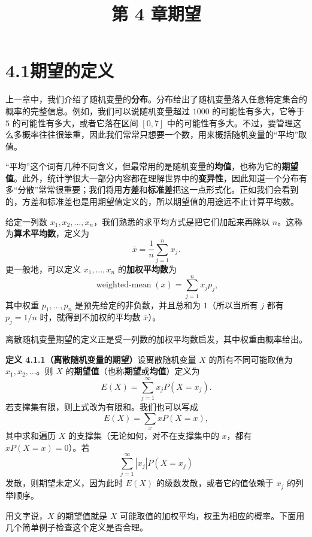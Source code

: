 \documentclass[UTF8,12pt,a4paper,fontset=fandol]{ctexart}
\title{第 4 章\quad 期望}
\author{}
\date{}
\begin{document}
\maketitle

\section*{4.1\quad 期望的定义}

上一章中，我们介绍了随机变量的\textbf{分布}。分布给出了随机变量落入任意特定集合的概率的完整信息。例如，我们可以说随机变量超过 $1000$ 的可能性有多大，它等于 $5$ 的可能性有多大，或者它落在区间 $[0,7]$ 中的可能性有多大。不过，要管理这么多概率往往很笨重，因此我们常常只想要一个数，用来概括随机变量的“平均”取值。

“平均”这个词有几种不同含义，但最常用的是随机变量的\textbf{均值}，也称为它的\textbf{期望值}。此外，统计学很大一部分内容都在理解世界中的\textbf{变异性}，因此知道一个分布有多“分散”常常很重要；我们将用\textbf{方差}和\textbf{标准差}把这一点形式化。正如我们会看到的，方差和标准差也是用期望值定义的，所以期望值的用途远不止计算平均数。

给定一列数 $x_1,x_2,\ldots,x_n$，我们熟悉的求平均方式是把它们加起来再除以 $n$。这称为\textbf{算术平均数}，定义为
\[
  \bar{x}=\frac{1}{n}\sum_{j=1}^n x_j.
\]
更一般地，可以定义 $x_1,\ldots,x_n$ 的\textbf{加权平均数}为
\[
  \operatorname{weighted\mbox{-}mean}(x)=\sum_{j=1}^n x_jp_j,
\]
其中权重 $p_1,\ldots,p_n$ 是预先给定的非负数，并且总和为 $1$（所以当所有 $j$ 都有 $p_j=1/n$ 时，就得到不加权的平均数 $\bar{x}$）。

离散随机变量期望的定义正是受一列数的加权平均数启发，其中权重由概率给出。

\noindent\textbf{定义 4.1.1（离散随机变量的期望）}\quad 设离散随机变量 $X$ 的所有不同可能取值为 $x_1,x_2,\ldots$。则 $X$ 的\textbf{期望值}（也称\textbf{期望}或\textbf{均值}）定义为
\[
  E(X)=\sum_{j=1}^{\infty}x_jP(X=x_j).
\]
若支撑集有限，则上式改为有限和。我们也可以写成
\[
  E(X)=\sum_x xP(X=x),
\]
其中求和遍历 $X$ 的支撑集（无论如何，对不在支撑集中的 $x$，都有 $xP(X=x)=0$）。若
\[
  \sum_{j=1}^{\infty}|x_j|P(X=x_j)
\]
发散，则期望未定义，因为此时 $E(X)$ 的级数发散，或者它的值依赖于 $x_j$ 的列举顺序。

用文字说，$X$ 的期望值就是 $X$ 可能取值的加权平均，权重为相应的概率。下面用几个简单例子检查这个定义是否合理。
\end{document}

